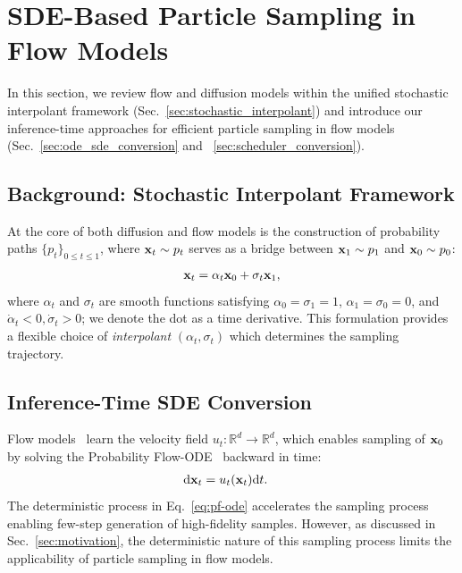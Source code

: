 
\vspace{-1.9\baselineskip}
\section{SDE-Based Particle Sampling in Flow Models}
\vspace{-0.6\baselineskip}
\label{sec:method}
In this section, we review flow and diffusion models within the unified stochastic interpolant framework (Sec.~\ref{sec:stochastic_interpolant}) and introduce our inference-time approaches for efficient particle sampling in flow models (Sec.~\ref{sec:ode_sde_conversion} and ~\ref{sec:scheduler_conversion}). 

\vspace{-0.4\baselineskip}
\subsection{Background: Stochastic Interpolant Framework}
\vspace{-0.5\baselineskip}
\label{sec:stochastic_interpolant}
At the core of both diffusion and flow models is the construction of probability paths $\{ p_t \}_{0 \leq t \leq 1}$, where $\mathbf{x}_t \sim p_t$ serves as a bridge between $\mathbf{x}_1 \sim p_1$ and $\mathbf{x}_0 \sim p_0$:
\begin{align}
    \label{eq:stochastic_interpolant}
    \mathbf{x}_t=\alpha_t \mathbf{x}_0 + \sigma_t \mathbf{x}_1,
\end{align}
where $\alpha_t$ and $\sigma_t$ are smooth functions satisfying $\alpha_0 = \sigma_1 = 1$, $\alpha_1 = \sigma_0 = 0$, and $\Dot{\alpha}_t < 0, \Dot{\sigma}_t > 0$; we denote the dot as a time derivative. This formulation provides a flexible choice of \textit{interpolant} $(\alpha_t, \sigma_t)$ which determines the sampling trajectory. 

\vspace{-0.4\baselineskip}
\subsection{Inference-Time SDE Conversion}
\vspace{-0.5\baselineskip}
\label{sec:ode_sde_conversion}
Flow models~\cite{Lipman:2023CFM, Liu:2023RF} learn the velocity field $u_{t} : \mathbb{R}^d \rightarrow \mathbb{R}^d$, which enables sampling of $\mathbf{x}_0$ by solving the Probability Flow-ODE~\cite{Song:2021SDE} backward in time:
\begin{align}
    \label{eq:pf-ode}
    \mathrm{d} \mathbf{x}_t &= u_{t}(\mathbf{x}_t) \mathrm{d} t.
\end{align}
The deterministic process in Eq.~\ref{eq:pf-ode} accelerates the sampling process enabling few-step generation of high-fidelity samples. However, as discussed in Sec.~\ref{sec:motivation}, the deterministic nature of this sampling process limits the applicability of particle sampling in flow models. 

